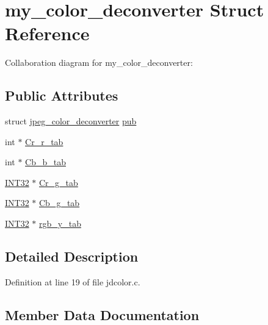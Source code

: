 \hypertarget{structmy__color__deconverter}{}\section{my\+\_\+color\+\_\+deconverter Struct Reference}
\label{structmy__color__deconverter}


Collaboration diagram for my\+\_\+color\+\_\+deconverter\+:
\subsection*{Public Attributes}
\begin{DoxyCompactItemize}
\item 
struct \mbox{\hyperlink{structjpeg__color__deconverter}{jpeg\+\_\+color\+\_\+deconverter}} \mbox{\hyperlink{structmy__color__deconverter_a54bf241de985ca2e06da2bbee14e745a}{pub}}
\item 
int $\ast$ \mbox{\hyperlink{structmy__color__deconverter_a25c4ee8d1066262c23a8181758eb0231}{Cr\+\_\+r\+\_\+tab}}
\item 
int $\ast$ \mbox{\hyperlink{structmy__color__deconverter_aa40b60773afd04e0b076f83ed00069c9}{Cb\+\_\+b\+\_\+tab}}
\item 
\mbox{\hyperlink{jmorecfg_8h_a0cb58e7e6f0bad369840a52e54a56ae0}{I\+N\+T32}} $\ast$ \mbox{\hyperlink{structmy__color__deconverter_ab44aebbe0bd6d32aec678c71f7758bfc}{Cr\+\_\+g\+\_\+tab}}
\item 
\mbox{\hyperlink{jmorecfg_8h_a0cb58e7e6f0bad369840a52e54a56ae0}{I\+N\+T32}} $\ast$ \mbox{\hyperlink{structmy__color__deconverter_abb16c33e195531366787333d6b7a2ef6}{Cb\+\_\+g\+\_\+tab}}
\item 
\mbox{\hyperlink{jmorecfg_8h_a0cb58e7e6f0bad369840a52e54a56ae0}{I\+N\+T32}} $\ast$ \mbox{\hyperlink{structmy__color__deconverter_ad34e0f9d33aaf4b6329e65a95ec8130e}{rgb\+\_\+y\+\_\+tab}}
\end{DoxyCompactItemize}


\subsection{Detailed Description}


Definition at line 19 of file jdcolor.\+c.



\subsection{Member Data Documentation}
\mbox{\label{structmy__color__deconverter_aa40b60773afd04e0b076f83ed00069c9}} 
